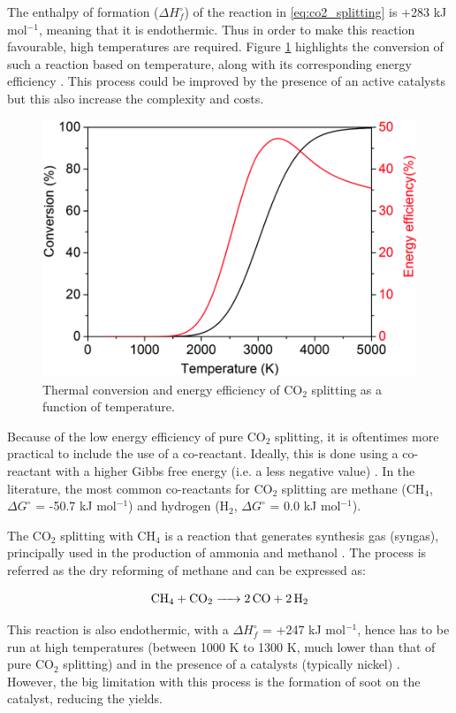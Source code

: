 The enthalpy of formation ($\Delta H^\circ_f$) of the reaction in \ref{eq:co2_splitting} is +283 kJ mol$^{-1}$, meaning that it is endothermic. Thus in order to make this reaction favourable, high temperatures are required. Figure \ref{fig:thermal_co2_conversion} highlights the conversion of such a reaction based on temperature, along with its corresponding energy efficiency \cite{Snoeckx2017}. This process could be improved by the presence of an active catalysts but this also increase the complexity and costs. 

\begin{figure}[h!]
	\centering
	\includegraphics[width=0.6\linewidth]{chapter_3/figures/thermal_co2_conversion.png}
	\caption{Thermal conversion and energy efficiency of CO$_2$ splitting as a function of temperature. \cite{Snoeckx2017}}
	\label{fig:thermal_co2_conversion}
\end{figure}

Because of the low energy efficiency of pure CO$_2$ splitting, it is oftentimes more practical to include the use of a co-reactant. Ideally, this is done using a co-reactant with a higher Gibbs free energy (i.e. a less negative value) \cite{jiang_xiao_kuznetsov_edwards_2010}. In the literature, the most common co-reactants for CO$_2$ splitting are methane (CH$_4$, $\Delta G^\circ$ = -50.7 kJ mol$^{-1}$) and hydrogen (H$_2$, $\Delta G^\circ$ = 0.0 kJ mol$^{-1}$).

The CO$_2$ splitting with CH$_4$ is a reaction that generates synthesis gas (syngas), principally used in the production of ammonia and methanol \cite{}. The process is referred as the dry reforming of methane and can be expressed as: 

\begin{equation}
    \ce{CH_4 + CO_2 -> 2CO + 2H_2}
    \label{eq:drm}
\end{equation}

This reaction is also endothermic, with a $\Delta H^\circ_f$ = +247 kJ mol$^{-1}$, hence has to be run at high temperatures (between 1000 K to 1300 K, much lower than that of pure CO$_2$ splitting) and in the presence of a catalysts (typically nickel) \cite{pakhare_spivey_2014}. However, the big limitation with this process is the formation of soot on the catalyst, reducing the yields.

